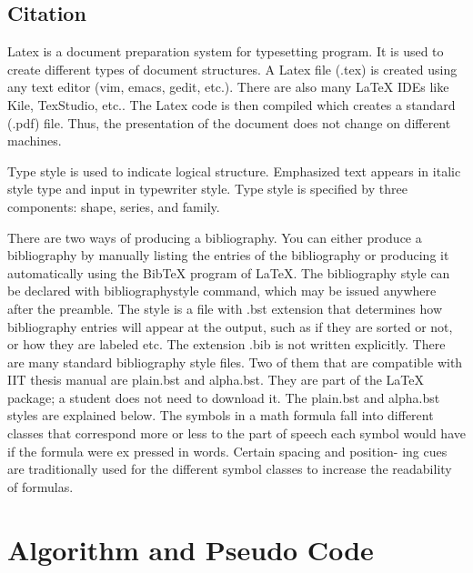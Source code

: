 \documentclass{article}
\begin{document}
        \subsection{Citation}
        Latex\cite{networking} is a  document preparation system for typesetting program. It is used to create different types of document structures. A Latex file (.tex) is created using any text editor (vim, emacs, gedit, etc.). There are also many LaTeX IDEs like Kile, TexStudio, etc.. The Latex code is then compiled which creates a standard (.pdf) file. Thus, the presentation of the document does not change on different machines.\par
        Type style\cite{2} is used to indicate logical structure. Emphasized text appears in italic style type and input in typewriter style. Type style is specified by three components: shape, series, and family.\par
        There are two ways of producing a bibliography\cite{3}. You can either produce a bibliography by manually listing the entries of the bibliography or producing it automatically using the BibTeX program of LaTeX. The bibliography style can be declared with bibliographystyle command, which may be issued anywhere after the preamble. The style is a file with .bst extension that determines how bibliography entries will appear at the output, such as if they are sorted or not, or how they are labeled etc. The extension .bib is not written explicitly. There are many standard bibliography style files. Two of them that are compatible with IIT thesis manual are plain.bst and alpha.bst. They are part of the LaTeX package; a student does not need to download it. The plain.bst and alpha.bst styles are explained below. The symbols in a math formula fall into different classes that correspond more or less to the part of speech each symbol would have if the formula were ex pressed in words. Certain spacing and position- ing cues are traditionally used for the different symbol classes to increase the readability of formulas. \cite{4}

            
        
        
    \section{Algorithm and Pseudo Code}
\end{document}
